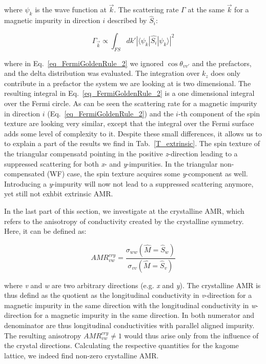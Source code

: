 \documentclass[prb,showpacs,amsmath,amssymb,superscriptaddress,twocolumn,floatfix]{revtex4-1}
\begin{document}
where $\psi_k$ is the wave function at $\vec{k}$. The scattering rate $\Gamma$ at the same $\vec{k}$ for a magnetic impurity in direction $i$ described by $\hat{S}_i$:

\begin{equation}	
	{\Gamma_{\vec{k}}} \propto \int_{FS} dk' |\langle \psi_k |\hat{S_i}|\psi_k \rangle|^2
	\label{eq_FermiGoldenRule_2}
\end{equation}

where in Eq.~\ref{eq_FermiGoldenRule_2} we ignored $\cos \theta_{vv'}$ and the prefactors, and the delta distribution was evaluated. The integration over $k_z$ does only contribute in a prefactor the system we are looking at is two dimensional. The resulting integral in Eq.~\ref{eq_FermiGoldenRule_2} is a one dimensional integral over the Fermi circle. As can be seen the scattering rate for a magnetic impurity in direction $i$ (Eq.~\ref{eq_FermiGoldenRule_2}) and the $i$-th component of the spin texture are looking very similar, except that the integral over the Fermi surface adds some level of complexity to it. Despite these small differences, it allows us to to explain a part of the results we find in Tab.~\ref{T_extrinsic}. The spin texture of the triangular compensatd pointing in the positive \textit{z}-direction leading to a suppressed scattering for both \textit{x}- and \textit{y}-impurities. In the triangular non-compensated (WF) case, the spin texture acquires some \textit{y}-component as well. Introducing a \textit{y}-impurity will now not lead to a suppressed scattering anymore, yet still not exhbit extrinsic AMR.

In the last part of this section, we investigate at the crystalline AMR, which refers to the anisotropy of conductivity created by the crystalline symmetry. Here, it can be defined as:

\begin{equation}
	AMR^{cry}_{vw} = \frac{\sigma_{ww} (\hat{M} = \hat{S}_w)}{\sigma_{vv} (\hat{M} = \hat{S}_v)}
\end{equation}

where \textit{v} and \textit{w} are two arbitrary directions (e.g. \textit{x} and \textit{y}). The crystalline AMR is thus defind as the quotient as the longitudinal conductivity in \textit{v}-direction for a magnetic impurity in the same direction with the longitudinal conductivity in \textit{w}-direction for a magnetic impurity in the same direction. In both numerator and denominator are thus longitudinal conductivities with parallel aligned impurity. The resulting anisotropy $AMR^{cry}_{vw} \neq 1$ would thus arise only from the influence of the crystal directions. Calculating the respective quantities for the kagome lattice, we indeed find non-zero crystalline AMR.
\end{document}
